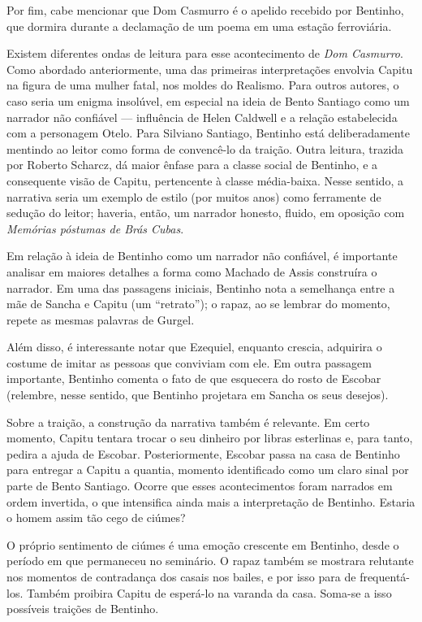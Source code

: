 Por fim, cabe mencionar que Dom Casmurro é o apelido recebido por Bentinho, que dormira durante a declamação de um poema em uma estação ferroviária.

Existem diferentes ondas de leitura para esse acontecimento de \textit{Dom Casmurro}. Como abordado anteriormente, uma das primeiras interpretações envolvia Capitu na figura de uma mulher fatal, nos moldes do Realismo. Para outros autores, o caso seria um enigma insolúvel, em especial na ideia de Bento Santiago como um narrador não confiável — influência de Helen Caldwell e a relação estabelecida com a personagem Otelo. Para Silviano Santiago, Bentinho está deliberadamente mentindo ao leitor como forma de convencê-lo da traição. Outra leitura, trazida por Roberto Scharcz, dá maior ênfase para a classe social de Bentinho, e a consequente visão de Capitu, pertencente à classe média-baixa. Nesse sentido, a narrativa seria um exemplo de estilo (por muitos anos) como ferramente de sedução do leitor; haveria, então, um narrador honesto, fluido, em oposição com \textit{Memórias póstumas de Brás Cubas}.

Em relação à ideia de Bentinho como um narrador não confiável, é importante analisar em maiores detalhes a forma como Machado de Assis construíra o narrador. Em uma das passagens iniciais, Bentinho nota a semelhança entre a mãe de Sancha e Capitu (um ``retrato''); o rapaz, ao se lembrar do momento, repete as mesmas palavras de Gurgel.

Além disso, é interessante notar que Ezequiel, enquanto crescia, adquirira o costume de imitar as pessoas que conviviam com ele. Em outra passagem importante, Bentinho comenta o fato de que esquecera do rosto de Escobar (relembre, nesse sentido, que Bentinho projetara em Sancha os seus desejos).

Sobre a traição, a construção da narrativa também é relevante. Em certo momento, Capitu tentara trocar o seu dinheiro por libras esterlinas e, para tanto, pedira a ajuda de Escobar. Posteriormente, Escobar passa na casa de Bentinho para entregar a Capitu a quantia, momento identificado como um claro sinal por parte de Bento Santiago. Ocorre que esses acontecimentos foram narrados em ordem invertida, o que intensifica ainda mais a interpretação de Bentinho. Estaria o homem assim tão cego de ciúmes?

O próprio sentimento de ciúmes é uma emoção crescente em Bentinho, desde o período em que permaneceu no seminário. O rapaz também se mostrara relutante nos momentos de contradança dos casais nos bailes, e por isso para de frequentá-los. Também proibira Capitu de esperá-lo na varanda da casa. Soma-se a isso possíveis traições de Bentinho.

